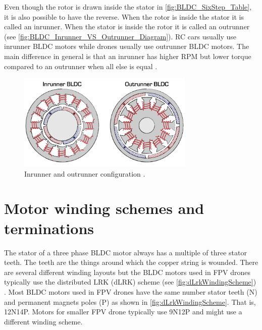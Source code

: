 \documentclass[]{report}
\begin{document}
Even though the rotor is drawn inside the stator in \autoref{fig:BLDC_SixStep_Table}, it is also possible to have the reverse. When the rotor is inside the stator it is called an inrunner. When the stator is inside the rotor it is called an outrunner (see \autoref{fig:BLDC_Inrunner_VS_Outrunner_Diagram}). RC cars usually use inrunner BLDC motors while drones usually use outrunner BLDC motors. The main difference in general is that an inrunner has higher RPM but lower torque compared to an outrunner when all else is equal \cite{BLDC_Inrunner_VS_Outrunner}.
	
\begin{figure}[H]
	\centering
	\includegraphics[width=0.75\textwidth]{InOutRunner-2.png}
	\caption{Inrunner and outrunner configuration \cite{BLDC_Inrunner_VS_Outrunner_Diagram}.}
	\label{fig:BLDC_Inrunner_VS_Outrunner_Diagram}
\end{figure}

\section{Motor winding schemes and terminations} \label{section:WindingSchemes}
The stator of a three phase BLDC motor always has a multiple of three stator teeth. The teeth are the things around which the copper string is wounded. There are several different winding layouts but the BLDC motors used in FPV drones typically use the distributed LRK (dLRK) scheme (see \autoref{fig:dLrkWindingScheme}) \cite{FpvBldcWindingSchema}. Most BLDC motors used in FPV drones have the same number stator teeth (N) and permanent magnets poles (P) as shown in \autoref{fig:dLrkWindingScheme}. That is, 12N14P. Motors for smaller FPV drone typically use 9N12P and might use a different winding scheme.
\end{document}
